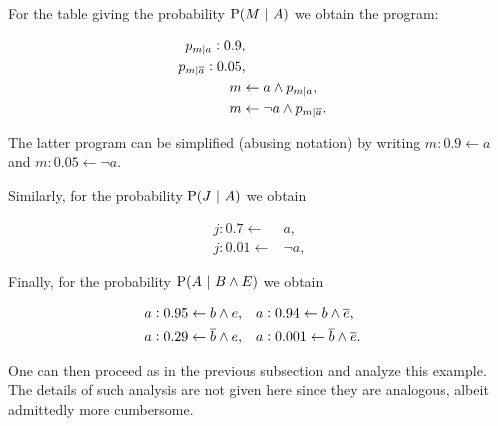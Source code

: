 \documentclass{article}
\newcommand{\at}[1]{\ensuremath{\!\del{#1}}}
\newcommand{\co}[1]{\ensuremath{\overline{#1}}}
\newcommand{\prfunc}{\ensuremath{\mathrm{P}}}
\newcommand{\pr}[1]{\ensuremath{\prfunc\at{#1}}}
\newcommand{\given}{\ensuremath{~\middle|~}}
\newcommand{\probfact}[2]{\ensuremath{#1:#2}}%
\newcommand{\probrule}[3]{\probfact{#1}{#2} \leftarrow #3}
\newcommand{\condsymb}[2]{\ensuremath{p_{#1|#2}}}
\begin{document}
For the table giving the probability $\pr{M \given A}$ we obtain the
program:

\begin{equation*}
	\begin{aligned}
		\probfact{\condsymb{m}{a}}{0.9}       & ,\cr
		\probfact{\condsymb{m}{\co{a}}}{0.05} & ,\cr
		m                                     & \leftarrow a \wedge \condsymb{m}{a},\cr
		m                                     & \leftarrow \neg a \wedge \condsymb{m}{\co{a}}.
	\end{aligned}
\end{equation*}

The latter program can be simplified (abusing notation) by writing
$\probrule{m}{0.9}{a}$ and $\probrule{m}{0.05}{\neg a}$.

Similarly, for the probability $\pr{J \given A}$ we obtain

\begin{equation*}
	\begin{aligned}
		\probrule{j}{0.7}{  & a},      \\
		\probrule{j}{0.01}{ & \neg a},
	\end{aligned}
\end{equation*}

Finally, for the probability $\pr{A \given B \wedge E}$ we obtain

\begin{equation*}
	\begin{aligned}
		\probrule{a}{0.95}{b \wedge e},      &  &  &
		\probrule{a}{0.94}{b \wedge \co{e}},\cr
		\probrule{a}{0.29}{\co{b} \wedge e}, &  &  &
		\probrule{a}{0.001}{\co{b} \wedge \co{e}}.
	\end{aligned}
\end{equation*}

One can then proceed as in the previous subsection and analyze this
example.  The details of such analysis are not given here since they
are analogous, albeit admittedly more cumbersome.
\end{document}
